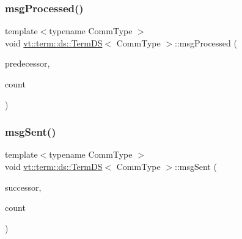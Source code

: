 \mbox{\label{structvt_1_1term_1_1ds_1_1_term_d_s_a16ad493d9d01db734c20ea9a55b0ffc5}} 
\subsubsection{\texorpdfstring{msg\+Processed()}{msgProcessed()}}
{\footnotesize\ttfamily template$<$typename Comm\+Type $>$ \\
void \hyperlink{structvt_1_1term_1_1ds_1_1_term_d_s}{vt\+::term\+::ds\+::\+Term\+DS}$<$ Comm\+Type $>$\+::msg\+Processed (\begin{DoxyParamCaption}\item[{\hyperlink{namespacevt_a866da9d0efc19c0a1ce79e9e492f47e2}{Node\+Type}}]{predecessor,  }\item[{\hyperlink{structvt_1_1term_1_1ds_1_1_term_d_s_a54f4ebd7e1ecb59c32c0f5b03ef9f20b}{Count\+Type}}]{count }\end{DoxyParamCaption})}

\mbox{\label{structvt_1_1term_1_1ds_1_1_term_d_s_af03262950f250a7ebceb7079d3113a58}} 
\subsubsection{\texorpdfstring{msg\+Sent()}{msgSent()}}
{\footnotesize\ttfamily template$<$typename Comm\+Type $>$ \\
void \hyperlink{structvt_1_1term_1_1ds_1_1_term_d_s}{vt\+::term\+::ds\+::\+Term\+DS}$<$ Comm\+Type $>$\+::msg\+Sent (\begin{DoxyParamCaption}\item[{\hyperlink{namespacevt_a866da9d0efc19c0a1ce79e9e492f47e2}{Node\+Type}}]{successor,  }\item[{\hyperlink{structvt_1_1term_1_1ds_1_1_term_d_s_a54f4ebd7e1ecb59c32c0f5b03ef9f20b}{Count\+Type}}]{count }\end{DoxyParamCaption})}

\mbox{\label{structvt_1_1term_1_1ds_1_1_term_d_s_a134c10ef8be4d5e9e7e834e14ebb0ab1}} 
